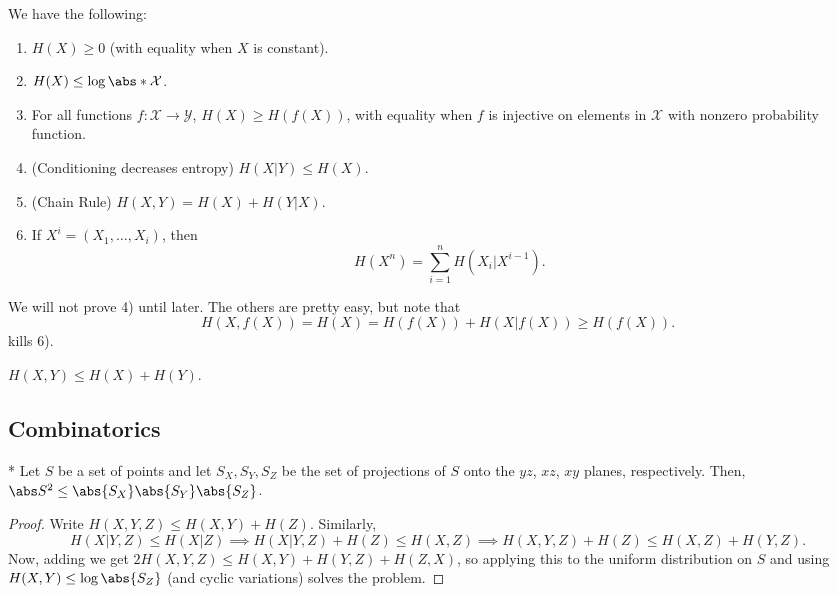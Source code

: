 \begin{fact}
	We have the following:
	\begin{enumerate}[label=\arabic*)]
		\item $H(X)\geq 0$ (with equality when $X$ is constant).
		\item $H(X)\leq \log \abs*{\mathcal X}$.
		\item For all functions $f\colon \mathcal X\to\mathcal Y$, $H(X) \geq H(f(X))$, with equality when $f$ is injective on elements in $\mathcal X$ with nonzero probability function.
		\item (Conditioning decreases entropy) $H(X|Y)\leq H(X)$.
		\item (Chain Rule) $H(X,Y) = H(X) + H(Y|X)$.
		\item If $X^i = (X_1,\ldots, X_i)$, then \[
				H(X^n) = \sum_{i=1}^n H(X_i|X^{i-1}).
			\]
	\end{enumerate}
\end{fact}

We will not prove 4) until later. The others are pretty easy, but note that \[
	H(X, f(X)) = H(X) = H(f(X)) + H(X|f(X)) \geq H(f(X)).
\]
kills 6).

\begin{cor}
	$H(X,Y) \leq H(X) + H(Y)$.
\end{cor}

\subsection{Combinatorics}

\begin{fact}*
	Let $S$ be a set of points and let $S_X, S_Y, S_Z$ be the set of projections of $S$ onto the $yz$, $xz$, $xy$ planes, respectively. Then, $\abs S^2 \leq \abs{S_X}\abs{S_Y}\abs{S_Z}$.
\end{fact}

\begin{proof}
	Write $H(X,Y,Z) \leq H(X,Y) + H(Z)$. Similarly, \[
		H(X|Y,Z) \leq H(X|Z) \implies H(X|Y,Z) + H(Z) \leq H(X,Z) \implies H(X,Y,Z) + H(Z) \leq H(X,Z) + H(Y,Z).
	\]
	Now, adding we get $2H(X,Y,Z) \leq H(X,Y) + H(Y,Z) + H(Z,X)$, so applying this to the uniform distribution on $S$ and using $H(X,Y) \leq \log \abs{S_Z}$ (and cyclic variations) solves the problem.
\end{proof}
